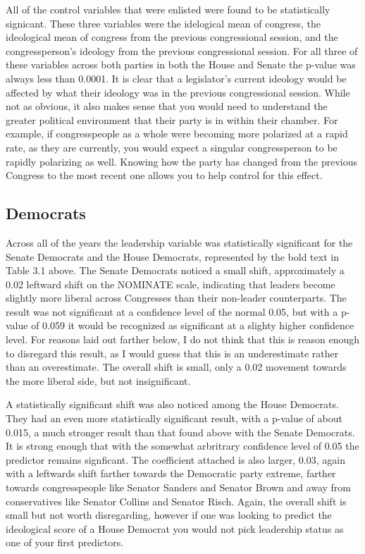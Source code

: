 \documentclass[12pt,twoside]{reedthesis}
\begin{document}
  All of the control variables that were enlisted were found to be
  statistically signicant. These three variables were the idelogical mean
  of congress, the ideological mean of congress from the previous
  congressional session, and the congressperson's ideology from the
  previous congressional session. For all three of these variables across
  both parties in both the House and Senate the p-value was always less
  than 0.0001. It is clear that a legislator's current ideology would be
  affected by what their ideology was in the previous congressional
  session. While not as obvious, it also makes sense that you would need
  to understand the greater political environment that their party is in
  within their chamber. For example, if congresspeople as a whole were
  becoming more polarized at a rapid rate, as they are currently, you
  would expect a singular congressperson to be rapidly polarizing as well.
  Knowing how the party has changed from the previous Congress to the most
  recent one allows you to help control for this effect.
  
  \subsection{Democrats}\label{democrats}
  
  Across all of the years the leadership variable was statistically
  significant for the Senate Democrats and the House Democrats,
  represented by the bold text in Table 3.1 above. The Senate Democrats
  noticed a small shift, approximately a 0.02 leftward shift on the
  NOMINATE scale, indicating that leaders become slightly more liberal
  across Congresses than their non-leader counterparts. The result was not
  significant at a confidence level of the normal 0.05, but with a p-value
  of 0.059 it would be recognized as significant at a slighty higher
  confidence level. For reasons laid out farther below, I do not think
  that this is reason enough to disregard this result, as I would guess
  that this is an underestimate rather than an overestimate. The overall
  shift is small, only a 0.02 movement towards the more liberal side, but
  not insignificant.
  
  A statistically significant shift was also noticed among the House
  Democrats. They had an even more statistically significant result, with
  a p-value of about 0.015, a much stronger result than that found above
  with the Senate Democrats. It is strong enough that with the somewhat
  arbritrary confidence level of 0.05 the predictor remains signficant.
  The coefficient attached is also larger, 0.03, again with a leftwards
  shift farther towards the Democratic party extreme, farther towards
  congresspeople like Senator Sanders and Senator Brown and away from
  conservatives like Senator Collins and Senator Risch. Again, the overall
  shift is small but not worth disregarding, however if one was looking to
  predict the ideological score of a House Democrat you would not pick
  leadership status as one of your first predictors.
  
\end{document}
